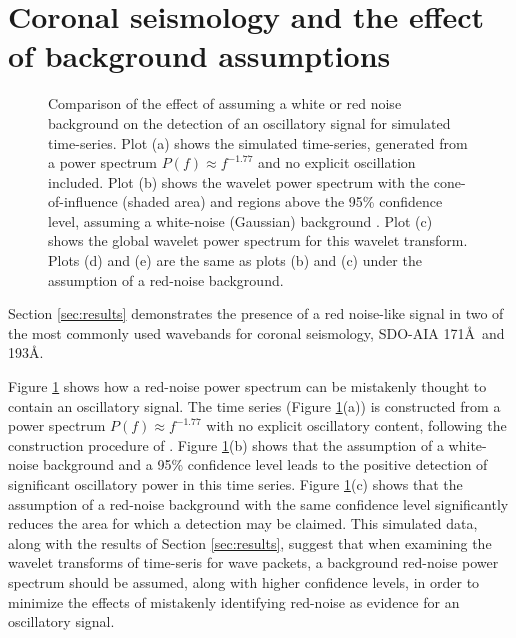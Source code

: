 \documentclass[manuscript]{../aastex52/aastex}
\begin{document}

\section{Coronal seismology and the effect of background assumptions}
\label{sec:corseis}

\begin{figure}
\caption{Comparison of the effect of assuming a white or red noise
  background on the detection of an oscillatory signal for simulated
  time-series.  Plot (a) shows the simulated time-series, generated
  from a power spectrum \protect$P(f)\approx f^{-1.77}$ and no
  explicit oscillation included.  Plot (b) shows the wavelet power
  spectrum with the cone-of-influence (shaded area) and regions above
  the 95\% confidence level, assuming a white-noise (Gaussian)
 background .  Plot (c) shows the global wavelet power spectrum for
  this wavelet transform.  Plots (d) and (e) are the same as plots (b)
  and (c) under the assumption of a red-noise background.\label{fig:comparison}}
\end{figure}

Section \ref{sec:results} demonstrates the presence of a red
noise-like signal in two of the most commonly used wavebands for
coronal seismology, SDO-AIA 171\AA\ and 193\AA.

Figure \ref{fig:comparison} shows how a red-noise power spectrum can
be mistakenly thought to contain an oscillatory signal.  The time
series (Figure \ref{fig:comparison}(a)) is constructed from a power
spectrum $P(f)\approx f^{-1.77}$ with no explicit oscillatory content,
following the construction procedure of \cite{vaughan2010}.  Figure
\ref{fig:comparison}(b) shows that the assumption of a white-noise
background and a 95\% confidence level leads to the positive detection
of significant oscillatory power in this time series. Figure
\ref{fig:comparison}(c) shows that the assumption of a red-noise
background with the same confidence level significantly reduces the
area for which a detection may be claimed.  This simulated data, along
with the results of Section \ref{sec:results}, suggest that when
examining the wavelet transforms of time-seris for wave packets, a
background red-noise power spectrum should be assumed, along with
higher confidence levels, in order to minimize the effects of
mistakenly identifying red-noise as evidence for an oscillatory
signal.
\end{document}
